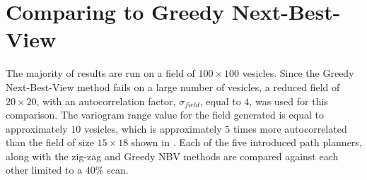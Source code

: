 \section{Comparing to Greedy Next-Best-View} \label{sec:s2_nbvcomp}
The majority of results are run on a field of $100 \times 100$ vesicles. Since the Greedy Next-Best-View method fails on a large number of vesicles, a reduced field of $20 \times 20$, with an autocorrelation factor, $\sigma_{field}$, equal to $4$, was used for this comparison. The variogram range value for the field generated is equal to approximately $10$ vesicles, which is approximately $5$ times more autocorrelated than the field of size $15 \times 18$ shown in \cite{fentanes:soilkrig}. Each of the five introduced path planners, along with the zig-zag and Greedy NBV methods are compared against each other limited to a $40\%$ scan. \\\\

